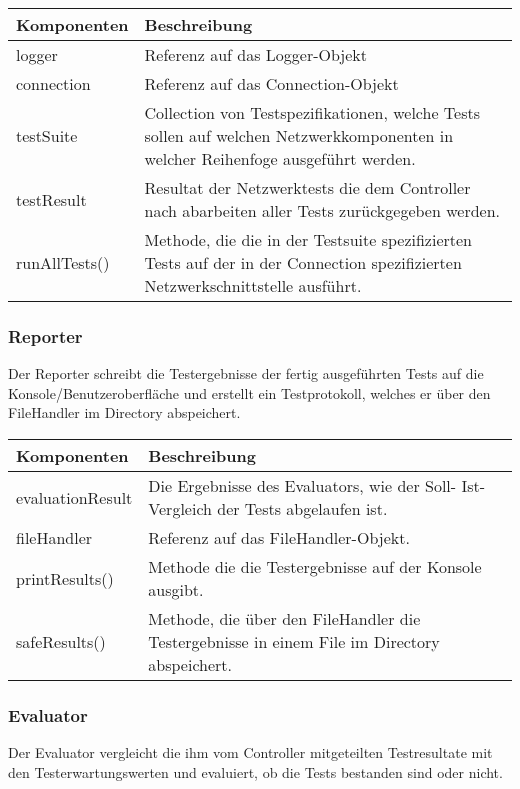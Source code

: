 \documentclass[
	ngerman,
	toc=listof, %
	toc=bibliography, %
	footnotes=multiple, %
	parskip=half, %
	numbers=noendperiod %
]{scrartcl}
\begin{document}
	\begin{tabularx}{\textwidth}{lX}
		\toprule
			Komponenten & Beschreibung \\
		\midrule
			logger & Referenz auf das Logger-Objekt \\ 
			connection & Referenz auf das Connection-Objekt \\
			testSuite & Collection von Testspezifikationen, welche Tests sollen auf welchen Netzwerkkomponenten in welcher Reihenfoge ausgeführt werden. \\
			testResult & Resultat der Netzwerktests die dem Controller nach abarbeiten aller Tests zurückgegeben werden. \\			
		\midrule
			runAllTests() & Methode, die die in der Testsuite spezifizierten Tests auf der in der Connection spezifizierten Netzwerkschnittstelle ausführt. \\
		\bottomrule
	\end{tabularx}
	\newpage

	\subsubsection{Reporter}
	Der Reporter schreibt die Testergebnisse der fertig ausgeführten Tests auf die Konsole/Benutzeroberfläche und erstellt ein Testprotokoll, welches er über den FileHandler im Directory abspeichert.

	\begin{tabularx}{\textwidth}{lX}
		\toprule
			Komponenten & Beschreibung \\
		\midrule
			evaluationResult & Die Ergebnisse des Evaluators, wie der Soll- Ist-Vergleich der Tests abgelaufen ist. \\
			fileHandler & Referenz auf das FileHandler-Objekt. \\	
		\midrule
			printResults() & Methode die die Testergebnisse auf der Konsole ausgibt. \\
			safeResults() & Methode, die über den FileHandler die Testergebnisse in einem File im Directory abspeichert. \\
		\bottomrule
	\end{tabularx}

	\subsubsection{Evaluator}
	Der Evaluator vergleicht die ihm vom Controller mitgeteilten Testresultate mit den Testerwartungswerten und evaluiert, ob die Tests bestanden sind oder nicht.
\end{document}
